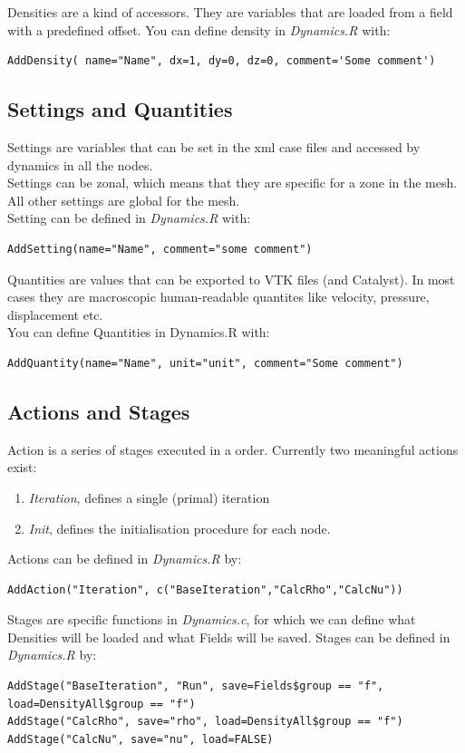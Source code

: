 \documentclass[12pt,a4paper]{report}
\begin{document}
Densities are a kind of accessors. They are variables that are loaded from a field with a predefined offset. You can define density in \textit{Dynamics.R} with:
\begin{lstlisting}
AddDensity( name="Name", dx=1, dy=0, dz=0, comment='Some comment')
\end{lstlisting}
\subsection{Settings and Quantities}
Settings are variables that can be set in the xml case files and accessed by dynamics in all the nodes. \\

Settings can be zonal, which means that they are specific for a zone in the mesh. All other settings are global for the mesh. \\

Setting can be defined in \textit{Dynamics.R} with:
\begin{lstlisting}
AddSetting(name="Name", comment="some comment")
\end{lstlisting}

Quantities are values that can be exported to VTK files (and Catalyst). In most cases they are macroscopic human-readable quantites like velocity, pressure, displacement etc. \\

You can define Quantities in Dynamics.R with:
\begin{lstlisting}
AddQuantity(name="Name", unit="unit", comment="Some comment")
\end{lstlisting}
\subsection{Actions and Stages}
Action is a series of stages executed in a order. Currently two meaningful actions exist:
\begin{enumerate}
\item \textit{Iteration}, defines a single (primal) iteration
\item \textit{Init}, defines the initialisation procedure for each node.
\end{enumerate}
Actions can be defined in \textit{Dynamics.R} by:
\begin{lstlisting}
AddAction("Iteration", c("BaseIteration","CalcRho","CalcNu"))
\end{lstlisting}

Stages are specific functions in \textit{Dynamics.c}, for which we can define what Densities will be loaded and what Fields will be saved. Stages can be defined in \textit{Dynamics.R} by:
\begin{lstlisting}
AddStage("BaseIteration", "Run", save=Fields$group == "f", load=DensityAll$group == "f")
AddStage("CalcRho", save="rho", load=DensityAll$group == "f")
AddStage("CalcNu", save="nu", load=FALSE)
\end{lstlisting}
\end{document}
